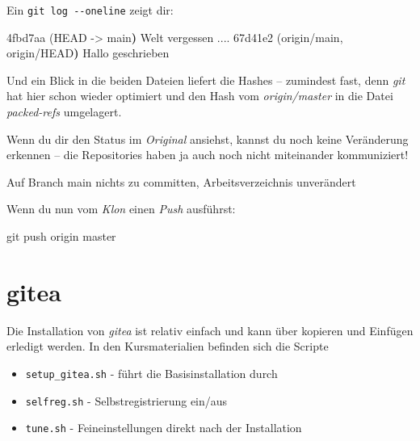 \documentclass[
  letterpaper,
  DIV=11]{scrreprt}
\newenvironment{Shaded}{\begin{snugshade}}{\end{snugshade}}
\newcommand{\AttributeTok}[1]{\textcolor[rgb]{0.40,0.45,0.13}{#1}}
\newcommand{\ErrorTok}[1]{\textcolor[rgb]{0.68,0.00,0.00}{#1}}
\newcommand{\ExtensionTok}[1]{\textcolor[rgb]{0.00,0.23,0.31}{#1}}
\newcommand{\FunctionTok}[1]{\textcolor[rgb]{0.28,0.35,0.67}{#1}}
\newcommand{\KeywordTok}[1]{\textcolor[rgb]{0.00,0.23,0.31}{\textbf{#1}}}
\newcommand{\NormalTok}[1]{\textcolor[rgb]{0.00,0.23,0.31}{#1}}
\newcommand{\OperatorTok}[1]{\textcolor[rgb]{0.37,0.37,0.37}{#1}}
\providecommand{\tightlist}{%
  \setlength{\itemsep}{0pt}\setlength{\parskip}{0pt}}\usepackage{longtable,booktabs,array}
\newcommand{\git}{\textit{git}\xspace}
\begin{document}
Ein \texttt{git\ log\ -\/-oneline} zeigt dir:

\begin{Shaded}
\begin{Highlighting}[]
\ExtensionTok{4fbd7aa} \ErrorTok{(}\ExtensionTok{HEAD} \AttributeTok{{-}}\OperatorTok{\textgreater{}}\NormalTok{ main}\KeywordTok{)} \ExtensionTok{Welt}\NormalTok{ vergessen ....}
\ExtensionTok{67d41e2} \ErrorTok{(}\ExtensionTok{origin/main,}\NormalTok{ origin/HEAD}\KeywordTok{)} \ExtensionTok{Hallo}\NormalTok{ geschrieben}
\end{Highlighting}
\end{Shaded}

Und ein Blick in die beiden Dateien liefert die Hashes -- zumindest
fast, denn \git hat hier schon wieder optimiert und den Hash vom
\emph{origin/master} in die Datei \emph{packed-refs} umgelagert.

Wenn du dir den Status im \emph{Original} ansiehst, kannst du noch keine
Veränderung erkennen -- die Repositories haben ja auch noch nicht
miteinander kommuniziert!

\begin{Shaded}
\begin{Highlighting}[]
\ExtensionTok{Auf}\NormalTok{ Branch main}
\ExtensionTok{nichts}\NormalTok{ zu committen, Arbeitsverzeichnis unverändert}
\end{Highlighting}
\end{Shaded}

Wenn du nun vom \emph{Klon} einen \emph{Push} ausführst:

\begin{Shaded}
\begin{Highlighting}[]
\FunctionTok{git}\NormalTok{ push origin master }
\end{Highlighting}
\end{Shaded}


\chapter{gitea}\label{gitea}

Die Installation von \emph{gitea} ist relativ einfach und kann über
kopieren und Einfügen erledigt werden. In den Kursmaterialien befinden
sich die Scripte

\begin{itemize}
\tightlist
\item
  \texttt{setup\_gitea.sh} - führt die Basisinstallation durch
\item
  \texttt{selfreg.sh} - Selbstregistrierung ein/aus
\item
  \texttt{tune.sh} - Feineinstellungen direkt nach der Installation
\end{itemize}
\end{document}
